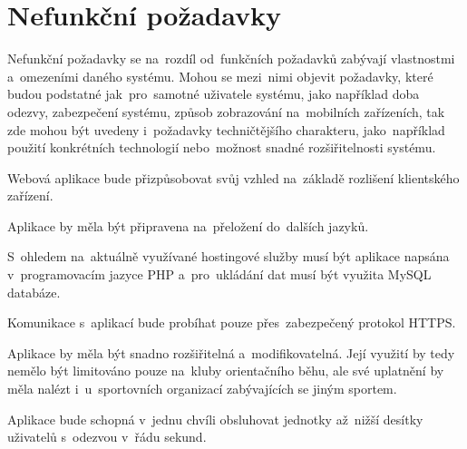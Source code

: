 \section{Nefunkční požadavky}
Nefunkční požadavky se na~rozdíl od~funkčních požadavků zabývají vlastnostmi a~omezeními daného systému. Mohou se mezi~nimi objevit požadavky, které budou podstatné jak~pro~samotné uživatele systému, jako například doba odezvy, zabezpečení systému, způsob zobrazování na~mobilních zařízeních, tak zde mohou být uvedeny i~požadavky techničtějšího charakteru, jako~například použití konkrétních technologií nebo~možnost snadné rozšiřitelnosti systému. \cite{requirements}

\begin{enumerate}[label=\textcolor{decoration}{\textbf{N\arabic*}}]
	Webová aplikace bude přizpůsobovat svůj vzhled na~základě rozlišení klientského zařízení.

	Aplikace by měla být připravena na~přeložení do~dalších jazyků.

	S~ohledem na~aktuálně využívané hostingové služby musí být aplikace napsána v~programovacím jazyce PHP a~pro~ukládání dat musí být využita MySQL databáze.

	Komunikace s~aplikací bude probíhat pouze přes~zabezpečený protokol HTTPS.

	Aplikace by měla být snadno rozšiřitelná a~modifikovatelná. Její využití by tedy nemělo být limitováno pouze na~kluby orientačního běhu, ale své uplatnění by měla nalézt i~u~sportovních organizací zabývajících se jiným sportem.

	Aplikace bude schopná v~jednu chvíli obsluhovat jednotky až~nižší desítky uživatelů s~odezvou v~řádu sekund.
\end{enumerate}
